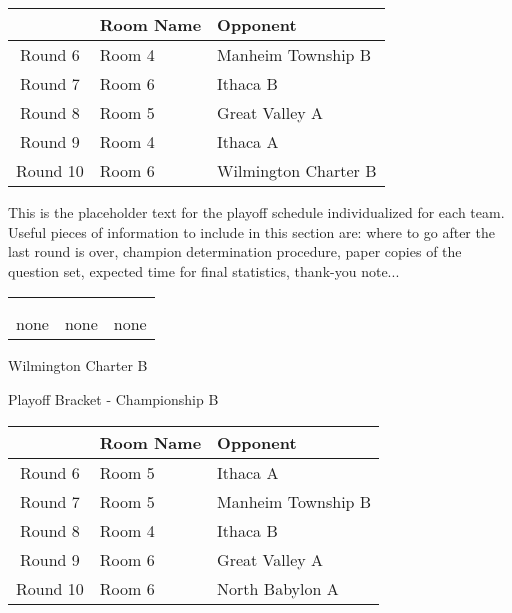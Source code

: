 \documentclass{article}%
\begin{document}
\vspace*{4pt}%
%
\begin{tabularx}{\textwidth}{|c|Y|Y|}%
\hline%
&Room Name&Opponent\\%
\hline%
Round 6&Room 4&Manheim Township B\\%
Round 7&Room 6&Ithaca B\\%
Round 8&Room 5&Great Valley A\\%
Round 9&Room 4&Ithaca A\\%
Round 10&Room 6&Wilmington Charter B\\%
\hline%
\end{tabularx}%
\vspace*{30pt}%
\linebreak%
This is the placeholder text for the playoff schedule individualized for each team. Useful pieces of information to include in this section are: where to go after the last round is over, champion determination procedure, paper copies of the question set, expected time for final statistics, thank{-}you note...%
\vspace*{30pt}%
\newline%
%
\begin{tabularx}{\textwidth}{YYY}%
  &  &  \\%
\\%
none&none&none\\%
\end{tabularx}%
\newpage%
\begin{center}%
\begin{Huge}%
Wilmington Charter B%
\end{Huge}%
\vspace*{12pt}%
\linebreak%
\begin{Large}%
Playoff Bracket {-} Championship B%
\end{Large}%
\end{center}%
\vspace*{4pt}%
%
\begin{tabularx}{\textwidth}{|c|Y|Y|}%
\hline%
&Room Name&Opponent\\%
\hline%
Round 6&Room 5&Ithaca A\\%
Round 7&Room 5&Manheim Township B\\%
Round 8&Room 4&Ithaca B\\%
Round 9&Room 6&Great Valley A\\%
Round 10&Room 6&North Babylon A\\%
\hline%
\end{tabularx}%
\end{document}
